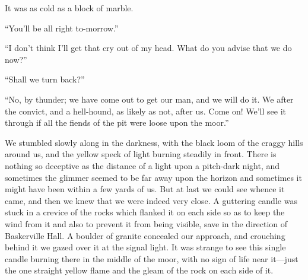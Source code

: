 \documentclass[paper=5.5in:8.5in,BCOR=7mm,twoside,DIV=calc,12pt,usegeometry,openany,chapterprefix,endperiod]{scrbook} %
\begin{document}
It was as cold as a block of marble.

\enquote{You'll be all right to-morrow.}

\enquote{I don't think I'll get that cry out of my head. What do you advise that we do now?}

\enquote{Shall we turn back?}

\enquote{No, by thunder; we have come out to get our man, and we will do it. We after the convict, and a hell-hound, as likely as not, after us. Come on! We'll see it through if all the fiends of the pit were loose upon the moor.}

We stumbled slowly along in the darkness, with the black loom of the craggy hills around us, and the yellow speck of light burning steadily in front. There is nothing so deceptive as the distance of a light upon a pitch-dark night, and sometimes the glimmer seemed to be far away upon the horizon and sometimes it might have been within a few yards of us. But at last we could see whence it came, and then we knew that we were indeed very close. A guttering candle was stuck in a crevice of the rocks which flanked it on each side so as to keep the wind from it and also to prevent it from being visible, save in the direction of Baskerville Hall. A boulder of granite concealed our approach, and crouching behind it we gazed over it at the signal light. It was strange to see this single candle burning there in the middle of the moor, with no sign of life near it\nobreakdash---just the one straight yellow flame and the gleam of the rock on each side of it.
\end{document}

